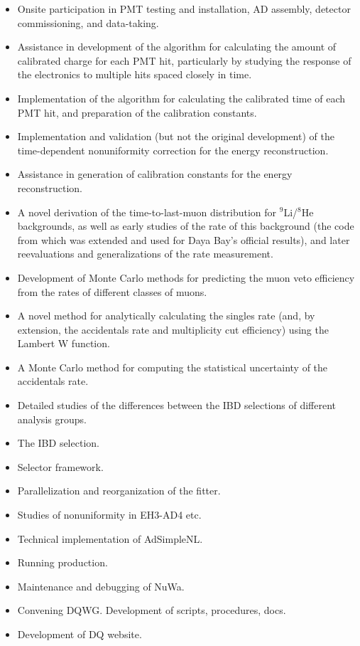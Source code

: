 \documentclass[../thesis.tex]{subfiles}
\begin{document}
\begin{itemize}
\item Onsite participation in PMT testing and installation, AD assembly, detector commissioning, and data-taking.
\item Assistance in development of the algorithm for calculating the amount of calibrated charge for each PMT hit, particularly by studying the response of the electronics to multiple hits spaced closely in time.
\item Implementation of the algorithm for calculating the calibrated time of each PMT hit, and preparation of the calibration constants.
\item Implementation and validation (but not the original development) of the time-dependent nonuniformity correction for the energy reconstruction.
\item Assistance in generation of calibration constants for the energy reconstruction.
\item A novel derivation of the time-to-last-muon distribution for $^9$Li/$^8$He backgrounds, as well as early studies of the rate of this background (the code from which was extended and used for Daya Bay's official results), and later reevaluations and generalizations of the rate measurement.
\item Development of Monte Carlo methods for predicting the muon veto efficiency from the rates of different classes of muons.
\item A novel method for analytically calculating the singles rate (and, by extension, the accidentals rate and multiplicity cut efficiency) using the Lambert W function.
\item A Monte Carlo method for computing the statistical uncertainty of the accidentals rate.
\item Detailed studies of the differences between the IBD selections of different analysis groups.
\item The IBD selection.
\item Selector framework.
\item Parallelization and reorganization of the fitter.
\item Studies of nonuniformity in EH3-AD4 etc.
\item Technical implementation of AdSimpleNL.
\item Running production.
\item Maintenance and debugging of NuWa.
\item Convening DQWG. Development of scripts, procedures, docs.
\item Development of DQ website.

\end{itemize}
\end{document}
